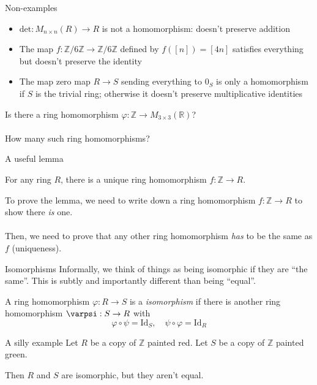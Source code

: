 \documentclass{beamer}
\newcommand{\Z}{\mathbb{Z}}
\newcommand{\R}{\mathbb{R}}
\begin{document}
\begin{frame}{Non-examples}
  \begin{itemize}
  \item $\text{det}: M_{n\times n}(R)\to R$ is not a homomorphism: doesn't preserve addition
  \item The map $f:\Z/6\Z\to \Z/6\Z$ defined by $f([n])=[4n]$ satisfies everything but doesn't preserve the identity
    \item The map zero map $R\to S$ sending everything to $0_S$ is only a homomorphism if $S$ is the trivial ring; otherwise it doesn't preserve multiplicative identities
\end{itemize}
  \end{frame}
\begin{frame}[plain,c]

\begin{center}

\Huge

Is there a ring homomorphism $\varphi:\Z\to M_{3\times 3}(\R)$? \\~\\

How many such ring homomorphisms?
\end{center}

\end{frame}

\begin{frame}{A useful lemma}

  \begin{lemma} For any ring $R$, there is a unique ring homomorphism $f:\Z\to R$.
  \end{lemma}

  To prove the lemma, we need to write down a ring homomorphism $f:\Z\to R$ to show there \emph{is} one. \\~\\

  Then, we need to prove that any other ring homomorphism \emph{has} to be the same as $f$ (uniqueness).
  \end{frame}

\begin{frame}{Isomorphisms}
Informally, we think of things as being isomorphic if they are ``the same''.  This is subtly and importantly different than being ``equal''.  

\begin{definition}
A ring homomorphism $\varphi:R\to S$ is a \emph{isomorphism} if there is another ring homomorphism $\varpsi:S\to R$ with $$\varphi\circ\psi=\text{Id}_S, \quad\psi\circ\varphi=\text{Id}_R$$
  \end{definition} 

\begin{block}{A silly example}
  Let {\color{red} $R$} be a copy of {\color{red} $\Z$} painted {\color{red}red}.
  Let {\color{green}$S$} be a copy of {\color{green}$\Z$} painted {\color{green}green}.

  Then {\color{red}$R$} and {\color{green}$S$} are isomorphic, but they aren't equal.
  \end{block}

\end{frame}
\end{document}
